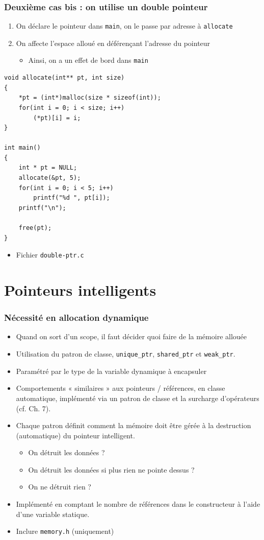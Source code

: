 \begin{frame}[containsverbatim]
\frametitle{Deuxième cas bis : on utilise un double pointeur}
\begin{enumerate}
\item On déclare le pointeur dans \texttt{main}, on le passe par adresse à \texttt{allocate}
\item On affecte l'espace alloué en déférençant l'adresse du pointeur
	\begin{itemize}
	\item Ainsi, on a un effet de bord dans \texttt{main}
	\end{itemize}
\end{enumerate}
\begin{lstlisting}
void allocate(int** pt, int size)
{
	*pt = (int*)malloc(size * sizeof(int));
	for(int i = 0; i < size; i++)
		(*pt)[i] = i;
}

int main()
{
	int * pt = NULL;
	allocate(&pt, 5);
	for(int i = 0; i < 5; i++)
		printf("%d ", pt[i]);
	printf("\n");

	free(pt);
}
\end{lstlisting}
\begin{itemize}
\item Fichier \texttt{double-ptr.c}
\end{itemize}
\end{frame}

\section{Pointeurs intelligents}

\begin{frame}
\frametitle{Nécessité en allocation dynamique}
\begin{itemize}[<+->]
\item Quand on sort d'un scope, il faut décider quoi faire de la mémoire allouée
\item Utilisation du patron de classe, \texttt{unique\_ptr}, \texttt{shared\_ptr} et \texttt{weak\_ptr}.
\item Paramétré par le type de la variable dynamique à encapsuler
\item Comportements « similaires » aux pointeurs / références, en classe automatique, implémenté via un patron de classe et la surcharge d'opérateurs (cf. Ch. 7).
\item Chaque patron définit comment la mémoire doit être gérée à la destruction (automatique) du pointeur intelligent.
	\begin{itemize}
	\item On détruit les données ?
	\item On détruit les données si plus rien ne pointe dessus ?
	\item On ne détruit rien ?
	\end{itemize}
\item Implémenté en comptant le nombre de références dans le constructeur à l'aide d'une variable statique.
\item Inclure \texttt{memory.h} (\cpp uniquement)
\end{itemize}
\end{frame}

